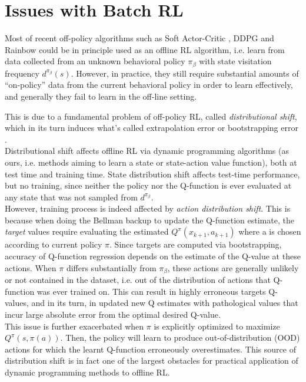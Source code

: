 \section{Issues with Batch RL} 

Most of recent off-policy algorithms such as Soft Actor-Critic \citep{Haarnoja2018}, 
DDPG \citep{Lillicrap2016} and Rainbow \citep{Hessel2018}  could be in principle used 
as an offline RL algorithm, i.e. learn from data collected from an unknown behavioral policy
$\pi_\beta$ with state visitation frequency $d^{\pi_\beta}(s)$. 
However, in practice, they still require substantial amounts
of “on-policy” data from the current behavioral policy in order to learn effectively, 
and generally they fail to learn in the off-line setting.

This is due to a fundamental problem of off-policy RL, called \textit{distributional shift}, which in 
its turn induces what's called extrapolation error \citep{Fujimoto2019} or bootstrapping error \citet{Kumar2019}.\\
Distributional shift affects offline RL via dynamic programming algorithms (as ours, i.e. methods aiming
to learn a state or state-action value function), both at test time and training time.
State distribution shift affects test-time performance, but no training, since neither the policy nor
the Q-function is ever evaluated at any state that was not sampled from $d^{\pi_\beta}$.\\
However, training process is indeed affected by \textit{action distribution shift}.
This is because when doing the Bellman backup to update the Q-function estimate,
the \textit{target} values require evaluating the estimated $Q^\pi(x_{k+1},a_{k+1})$ where
a is chosen according to current policy $\pi$.
Since targets are computed via bootstrapping, accuracy of Q-function regression depends
on the estimate of the Q-value at these actions. When $\pi$ differs substantially from $\pi_\beta$, 
these actions are generally unlikely or not contained in the dataset, i.e.
out of the distribution of actions that Q-function was ever trained on. This can result
in highly erroneous targets Q-values, and in its turn, in updated new Q estimates 
with pathological values that incur large absolute error from the optimal desired Q-value.\\
This issue is further exacerbated when $\pi$ is explicitly optimized to maximize $Q^\pi(s,\pi(a))$.
Then, the policy will learn to produce out-of-distribution (OOD) actions
for which the learnt Q-function erroneously overestimates.
This source of distribution shift is in fact one of the largest obstacles for practical application
of dynamic programming methods to offline RL.

